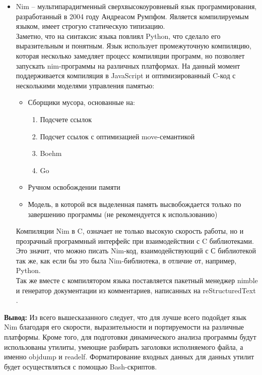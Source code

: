 \begin{itemize}
    \item Nim \autocite{nim} -- мультипарадигменный сверхвысокоуровневый 
        язык программирования, разработанный в 2004 году Андреасом Румпфом.
        Является компилируемым языком, имеет строгую статическую типизацию.\\
        Заметно, что на синтаксис языка повлиял Python, что сделало его
        выразительным и понятным. Язык использует промежуточную компиляцию, которая несколько
        замедляет процесс компиляции программ, но позволяет запускать nim-программы на различных
        платформах. На данный момент поддерживается компиляция в JavaScript \autocite{javascript}
        и оптимизированный C-код с несколькими моделями управления памятью:\\
        \begin{itemize}
            \item Сборщики мусора, основанные на:
                \begin{enumerate}
                    \item Подсчете ссылок
                    \item Подсчет ссылок с оптимизацией move-семантикой \autocite{nim-gc-move}
                    \item Boehm \autocite{boehm-gc}
                    \item Go \autocite{go-gc}
                \end{enumerate}
            \item Ручном освобождении памяти
            \item Модель, в которой вся выделенная память высвобождается только по завершению программы
                (не рекомендуется к использованию)
        \end{itemize}
        Компиляции Nim в C, означает не только высокую скорость работы, но и прозрачный программный интерфейс при взаимодействии с
        C библиотеками. Это значит, что можно писать Nim-код, взаимодействующий с С библиотекой так же, как
        если бы это была Nim-библиотека, в отличие от, например, Python.\\
        Так же вместе с компилятором языка поставляется пакетный менеджер nimble \autocite{nimble} и генератор
        документации из комментариев, написанных на reStructuredText \autocite{restructuredtext}.

\end{itemize}

\textbf{Вывод:} Из всего вышесказанного следует, что для {\ProgModule} лучше всего подойдет язык Nim
благодаря его скорости, выразительности и портируемости на различные платформы.
Кроме того, для подготовки динамического анализа программы будут использованы утилиты, умеющие разбирать
заголовки исполняемого файла, а именно objdump и readelf. Форматирование входных данных для данных утилит
будет осуществляться с помощью Bash-скриптов.

